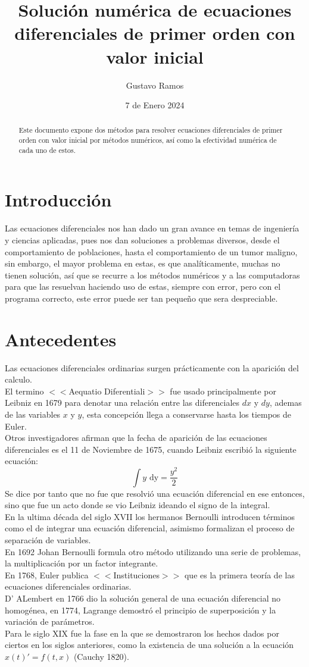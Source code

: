 \documentclass[10pt]{article}
\title{Solución numérica de ecuaciones diferenciales de primer orden con valor inicial}
\author{Gustavo Ramos}
\date{7 de Enero 2024}
\begin{document}
	\maketitle
	\begin{abstract}
		Este documento expone dos métodos para resolver ecuaciones diferenciales de primer orden con valor inicial por métodos numéricos, así como la efectividad numérica de cada uno de estos.
	\end{abstract}
	\newpage
	\tableofcontents
	\newpage
	\begin{multicols}{2}
		\section{Introducción}
			Las ecuaciones diferenciales nos han dado un gran avance en temas de ingeniería y ciencias aplicadas, pues nos dan soluciones a problemas diversos, desde el comportamiento de poblaciones, hasta el comportamiento de un tumor maligno, sin embargo, el mayor problema en estas, es que analíticamente, muchas no tienen solución, así que se recurre a los métodos numéricos y a las computadoras para que las resuelvan haciendo uso de estas, siempre con error, pero con el programa correcto, este error puede ser tan pequeño que sera despreciable.
		\section{Antecedentes}
			Las ecuaciones diferenciales ordinarias surgen prácticamente con la aparición del calculo.\\
			El termino $<<$Aequatio Diferentiali$>>$ fue usado principalmente por Leibniz en 1679 para denotar una relación entre las diferenciales $dx$ y $dy$, ademas de las variables $x$ y $y$, esta concepción llega a conservarse hasta los tiempos de Euler.\\
			Otros investigadores afirman que la fecha de aparición de las ecuaciones diferenciales es el 11 de Noviembre de 1675, cuando Leibniz escribió la siguiente ecuación:
			$$\int y \text{ dy}=\frac{y^2}{2}$$
			Se dice por tanto que no fue que resolvió una ecuación diferencial en ese entonces, sino que fue un acto donde se vio Leibniz ideando el signo de la integral.\\
			En la ultima década del siglo XVII los hermanos Bernoulli introducen términos como el de integrar una ecuación diferencial, asimismo formalizan el proceso de separación de variables.\\
			En 1692 Johan Bernoulli formula otro método utilizando una serie de problemas, la multiplicación por un factor integrante.\\
			En 1768, Euler publica $<<$Instituciones$>>$ que es la primera teoría de las ecuaciones diferenciales ordinarias.\\
			D' ALembert en 1766 dio la solución general de una ecuación diferencial no homogénea, en 1774, Lagrange demostró el principio de superposición y la variación de parámetros.\\
			Para le siglo XIX fue la fase en la que se demostraron los hechos dados por ciertos en los siglos anteriores, como la existencia de una solución a la ecuación $x(t)'=f(t,x)$ (Cauchy 1820).

\end{multicols}
\end{document}
